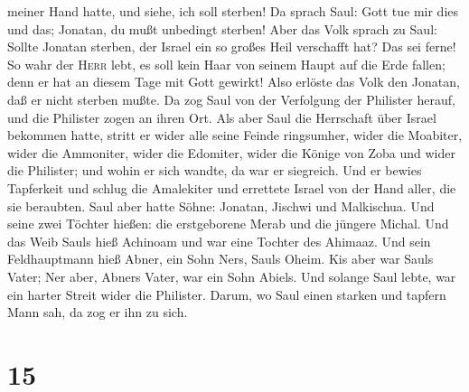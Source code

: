 meiner Hand hatte, und siehe, ich soll sterben! Da sprach Saul: Gott tue
mir dies und das; Jonatan, du mußt unbedingt sterben! 
Aber das Volk sprach zu Saul: Sollte Jonatan sterben, der Israel ein so
großes Heil verschafft hat? Das sei ferne! So wahr der \textsc{Herr}
lebt, es soll kein Haar von seinem Haupt auf die Erde fallen; denn er
hat an diesem Tage mit Gott gewirkt! Also erlöste das Volk den Jonatan,
daß er nicht sterben mußte.  Da zog Saul von der
Verfolgung der Philister herauf, und die Philister zogen an ihren Ort.
 Als aber Saul die Herrschaft über Israel bekommen hatte,
stritt er wider alle seine Feinde ringsumher, wider die Moabiter, wider
die Ammoniter, wider die Edomiter, wider die Könige von Zoba und wider
die Philister; und wohin er sich wandte, da war er siegreich.
 Und er bewies Tapferkeit und schlug die Amalekiter und
errettete Israel von der Hand aller, die sie beraubten. 
Saul aber hatte Söhne: Jonatan, Jischwi und Malkischua. Und seine zwei
Töchter hießen: die erstgeborene Merab und die jüngere Michal.
 Und das Weib Sauls hieß Achinoam und war eine Tochter
des Ahimaaz. Und sein Feldhauptmann hieß Abner, ein Sohn Ners, Sauls
Oheim.  Kis aber war Sauls Vater; Ner aber, Abners Vater,
war ein Sohn Abiels.  Und solange Saul lebte, war ein
harter Streit wider die Philister. Darum, wo Saul einen starken und
tapfern Mann sah, da zog er ihn zu sich.

\hypertarget{section-14}{%
\section{15}\label{section-14}}

